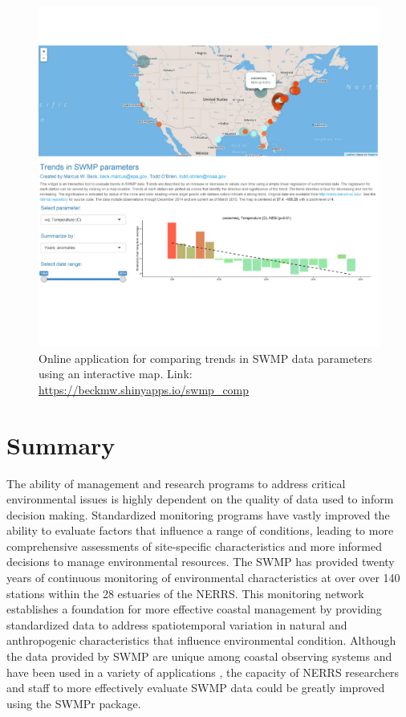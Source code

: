 \documentclass[10pt,letterpaper]{article}\usepackage[]{graphicx}\usepackage[]{color}
\begin{document}
\begin{figure}
\begin{center}
\includegraphics[width = \textwidth]{figure/swmp_comp.pdf}
\caption{Online application for comparing trends in \ac{SWMP} data parameters using an interactive map.  Link: \href{https://beckmw.shinyapps.io/swmp_comp}{https://beckmw.shinyapps.io/swmp\_comp}}
\label{fig:swmp_comp}
\end{center}
\end{figure}

\section*{Summary}

The ability of management and research programs to address critical environmental issues is highly dependent on the quality of data used to inform decision making.  Standardized monitoring programs have vastly improved the ability to evaluate factors that influence a range of conditions, leading to more comprehensive assessments of site-specific characteristics and more informed decisions to manage environmental resources.  The \acl{SWMP} has provided twenty years of continuous monitoring of environmental characteristics at over over 140 stations within the 28 estuaries of the \acl{NERRS}.  This monitoring network establishes a foundation  for more effective coastal management by providing standardized data to address spatiotemporal variation in natural and anthropogenic characteristics that influence environmental condition.  Although the data provided by \ac{SWMP} are unique among coastal observing systems and have been used in a variety of applications \cite{Bulthius95,Caffrey03,Sanger02,Wenner04,Dix08}, the capacity of \ac{NERRS} researchers and staff to more effectively evaluate \ac{SWMP} data could be greatly improved using the SWMPr package.
\end{document}

